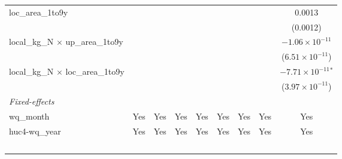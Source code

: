 \begin{tabular}{lcccccccc}
   loc\_area\_1to9y                            &                               &                               &                               &                               &                               &                               &                               & 0.0013\\   
                                               &                               &                               &                               &                               &                               &                               &                               & (0.0012)\\   
   local\_kg\_N $\times$ up\_area\_1to9y       &                               &                               &                               &                               &                               &                               &                               & $-1.06\times 10^{-11}$\\    
                                               &                               &                               &                               &                               &                               &                               &                               & ($6.51\times 10^{-11}$)\\    
   local\_kg\_N $\times$ loc\_area\_1to9y      &                               &                               &                               &                               &                               &                               &                               & $-7.71\times 10^{-11}$$^{*}$\\    
                                               &                               &                               &                               &                               &                               &                               &                               & ($3.97\times 10^{-11}$)\\    
   \midrule
   \emph{Fixed-effects}\\
   wq\_month                                   & Yes                           & Yes                           & Yes                           & Yes                           & Yes                           & Yes                           & Yes                           & Yes\\  
   huc4-wq\_year                               & Yes                           & Yes                           & Yes                           & Yes                           & Yes                           & Yes                           & Yes                           & Yes\\  
$$
\end{tabular}
